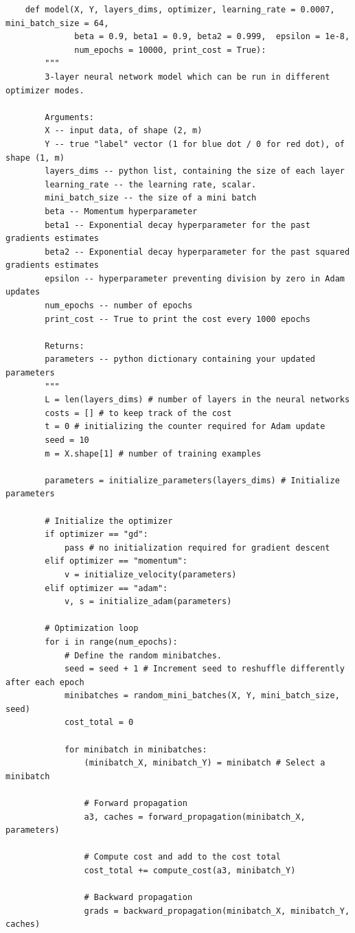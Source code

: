 \documentclass[11pt, a4paper]{article}
\begin{document}
\begin{spacing}{1.1}
	\begin{lstlisting}
	def model(X, Y, layers_dims, optimizer, learning_rate = 0.0007, mini_batch_size = 64, 
	          beta = 0.9, beta1 = 0.9, beta2 = 0.999,  epsilon = 1e-8, 
	          num_epochs = 10000, print_cost = True):
		"""
		3-layer neural network model which can be run in different optimizer modes.
		
		Arguments:
		X -- input data, of shape (2, m)
		Y -- true "label" vector (1 for blue dot / 0 for red dot), of shape (1, m)
		layers_dims -- python list, containing the size of each layer
		learning_rate -- the learning rate, scalar.
		mini_batch_size -- the size of a mini batch
		beta -- Momentum hyperparameter
		beta1 -- Exponential decay hyperparameter for the past gradients estimates 
		beta2 -- Exponential decay hyperparameter for the past squared gradients estimates 
		epsilon -- hyperparameter preventing division by zero in Adam updates
		num_epochs -- number of epochs
		print_cost -- True to print the cost every 1000 epochs
		
		Returns:
		parameters -- python dictionary containing your updated parameters 
		"""
		L = len(layers_dims) # number of layers in the neural networks
		costs = [] # to keep track of the cost
		t = 0 # initializing the counter required for Adam update
		seed = 10 
		m = X.shape[1] # number of training examples
		
		parameters = initialize_parameters(layers_dims) # Initialize parameters
		
		# Initialize the optimizer
		if optimizer == "gd":
			pass # no initialization required for gradient descent
		elif optimizer == "momentum":
			v = initialize_velocity(parameters)
		elif optimizer == "adam":
			v, s = initialize_adam(parameters)
		
		# Optimization loop
		for i in range(num_epochs):
			# Define the random minibatches.
			seed = seed + 1 # Increment seed to reshuffle differently after each epoch
			minibatches = random_mini_batches(X, Y, mini_batch_size, seed)
			cost_total = 0
			
			for minibatch in minibatches:
				(minibatch_X, minibatch_Y) = minibatch # Select a minibatch
				
				# Forward propagation
				a3, caches = forward_propagation(minibatch_X, parameters)
				
				# Compute cost and add to the cost total
				cost_total += compute_cost(a3, minibatch_Y)
				
				# Backward propagation
				grads = backward_propagation(minibatch_X, minibatch_Y, caches)
				

\end{lstlisting}
\end{spacing}
\end{document}

